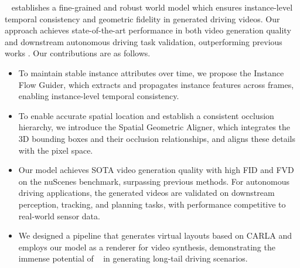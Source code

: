 \titleDef~ establishes a fine-grained and robust world model which ensures instance-level temporal consistency and geometric fidelity in generated driving videos. %
Our approach achieves state-of-the-art performance in both video generation quality and downstream autonomous driving task validation, outperforming previous works \cite{gao2024magicdrivedithighresolutionlongvideo, drivedreamer2, li2023drivingdiffusionlayoutguidedmultiviewdriving, wen2024panacea}. 
Our contributions are as follows. 
\begin{itemize}    
    \item To maintain stable instance attributes over time, we propose the Instance Flow Guider, which extracts and propagates instance features across frames, enabling instance-level temporal consistency.

    \item To enable accurate spatial location and establish a consistent occlusion hierarchy, we introduce the Spatial Geometric Aligner, which integrates the 3D bounding boxes and their occlusion relationships, and aligns these details with the pixel space.
    
    
    \item Our model achieves SOTA video generation quality with high FID and FVD on the nuScenes benchmark, surpassing previous methods. For autonomous driving applications, the generated videos are validated on downstream perception, tracking, and planning tasks, with performance competitive to real-world sensor data.

    \item We designed a pipeline that generates virtual layouts based on CARLA and employs our model as a renderer for video synthesis, demonstrating the immense potential of \titleDef~ in generating long-tail driving scenarios.

\end{itemize}



%